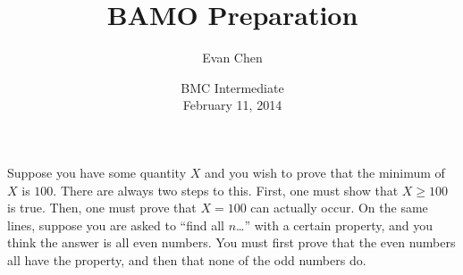 \documentclass[11pt]{scrartcl}
\begin{document}
\title{BAMO Preparation}
\author{Evan Chen}
\date{BMC Intermediate \\ February 11, 2014}
\maketitle

\begin{itemize}
  \ii Suppose you have some quantity $X$ and you wish to prove that the minimum of $X$ is $100$. There are always two steps to this. First, one must show that $X \ge 100$ is true. Then, one must prove that $X=100$ can actually occur.
  \ii On the same lines, suppose you are asked to ``find all $n$\dots'' with a certain property, and you think the answer is all even numbers. You must first prove that the even numbers all have the property, and then that none of the odd numbers do.
\end{itemize}
\end{document}
